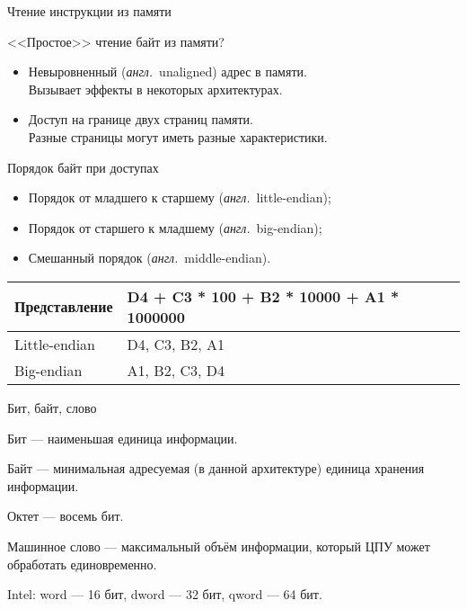 \documentclass{beamer}
\newcommand{\abbr}{\textit{англ.}\ }
\begin{document}
\begin{frame}{Чтение инструкции из памяти}

<<Простое>> чтение байт из памяти?

\pause

\begin{itemize}
    \item Невыровненный (\abbr unaligned) адрес в памяти. \\
    Вызывает эффекты в некоторых архитектурах.
    \pause\bigskip
    \item Доступ на границе двух страниц памяти. \\
    Разные страницы могут иметь разные характеристики.
\end{itemize}

\end{frame}

\begin{frame}{Порядок байт при доступах}

\begin{itemize}
    \item Порядок от младшего к старшему (\abbr little-endian);
    \item Порядок от старшего к младшему (\abbr big-endian);
    \item Смешанный порядок (\abbr middle-endian).
\end{itemize}

\pause

\begin{table}[htpb]
    \centering
    \begin{tabular}{|l|l|}
    \hline
    Представление   &   D4 + C3 * 100 + B2 * 10000 + A1 * 1000000   \\
    \hline
    Little-endian   &   D4, C3, B2, A1                              \\
    \hline
    Big-endian      &   A1, B2, C3, D4                              \\
    \hline
    \end{tabular}
\end{table}

\end{frame}

\begin{frame}{Бит, байт, слово}

Бит \pause — наименьшая единица информации.

\pause\bigskip

Байт \pause — минимальная адресуемая (в данной архитектуре) единица хранения
информации.

\pause\bigskip

Октет — восемь бит.

\pause\bigskip

Машинное слово \pause — максимальный объём информации, который ЦПУ может
обработать единовременно.

\pause\bigskip

Intel: word — 16 бит, dword — 32 бит, qword — 64 бит.

\end{frame}
\end{document}
